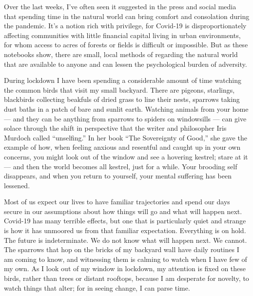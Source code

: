 Over the last weeks, I've often seen it suggested in the press and
social media that spending time in the natural world can bring comfort
and consolation during the pandemic. It's a notion rich with privilege,
for Covid-19 is disproportionately affecting communities with little
financial capital living in urban environments, for whom access to acres
of forests or fields is difficult or impossible. But as these notebooks
show, there are small, local methods of regarding the natural world that
are available to anyone and can lessen the psychological burden of
adversity.

During lockdown I have been spending a considerable amount of time
watching the common birds that visit my small backyard. There are
pigeons, starlings, blackbirds collecting beakfuls of dried grass to
line their nests, sparrows taking dust baths in a patch of bare and
sunlit earth. Watching animals from your home --- and they can be
anything from sparrows to spiders on windowsills --- can give solace
through the shift in perspective that the writer and philosopher Iris
Murdoch called ``unselfing.'' In her book ``The Sovereignty of Good,''
she gave the example of how, when feeling anxious and resentful and
caught up in your own concerns, you might look out of the window and see
a hovering kestrel; stare at it --- and then the world becomes all
kestrel, just for a while. Your brooding self disappears, and when you
return to yourself, your mental suffering has been lessened.

Most of us expect our lives to have familiar trajectories and spend our
days secure in our assumptions about how things will go and what will
happen next. Covid-19 has many terrible effects, but one that is
particularly quiet and strange is how it has unmoored us from that
familiar expectation. Everything is on hold. The future is
indeterminate. We do not know what will happen next. We cannot. The
sparrows that hop on the bricks of my backyard wall have daily routines
I am coming to know, and witnessing them is calming to watch when I have
few of my own. As I look out of my window in lockdown, my attention is
fixed on these birds, rather than trees or distant rooftops, because I
am desperate for novelty, to watch things that alter; for in seeing
change, I can parse time.

